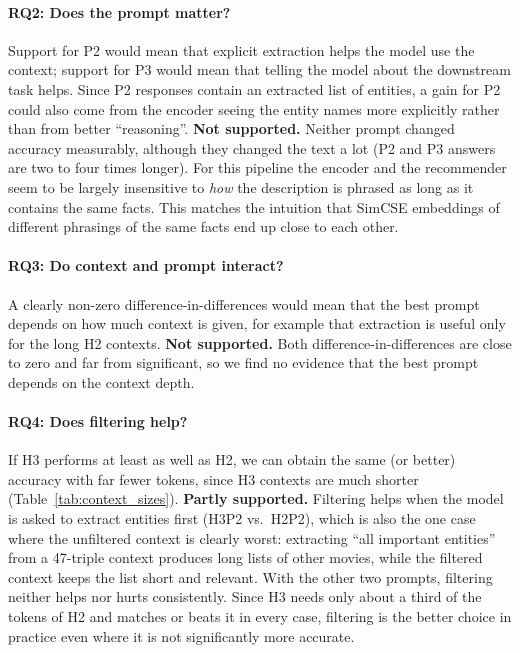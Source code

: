 \documentclass[a4paper,11pt]{article}
\begin{document}
\paragraph{RQ2: Does the prompt matter?} Support for P2 would mean that explicit extraction helps the model use the context; support for P3 would mean that telling the model about the downstream task helps. Since P2 responses contain an extracted list of entities, a gain for P2 could also come from the encoder seeing the entity names more explicitly rather than from better ``reasoning''. \textbf{Not supported.} Neither prompt changed accuracy measurably, although they changed the text a lot (P2 and P3 answers are two to four times longer). For this pipeline the encoder and the recommender seem to be largely insensitive to \emph{how} the description is phrased as long as it contains the same facts. This matches the intuition that SimCSE embeddings of different phrasings of the same facts end up close to each other.

\paragraph{RQ3: Do context and prompt interact?} A clearly non-zero difference-in-differences would mean that the best prompt depends on how much context is given, for example that extraction is useful only for the long H2 contexts. \textbf{Not supported.} Both difference-in-differences are close to zero and far from significant, so we find no evidence that the best prompt depends on the context depth.

\paragraph{RQ4: Does filtering help?} If H3 performs at least as well as H2, we can obtain the same (or better) accuracy with far fewer tokens, since H3 contexts are much shorter (Table~\ref{tab:context_sizes}). \textbf{Partly supported.} Filtering helps when the model is asked to extract entities first (H3P2 vs.\ H2P2), which is also the one case where the unfiltered context is clearly worst: extracting ``all important entities'' from a 47-triple context produces long lists of other movies, while the filtered context keeps the list short and relevant. With the other two prompts, filtering neither helps nor hurts consistently. Since H3 needs only about a third of the tokens of H2 and matches or beats it in every case, filtering is the better choice in practice even where it is not significantly more accurate.
\end{document}
